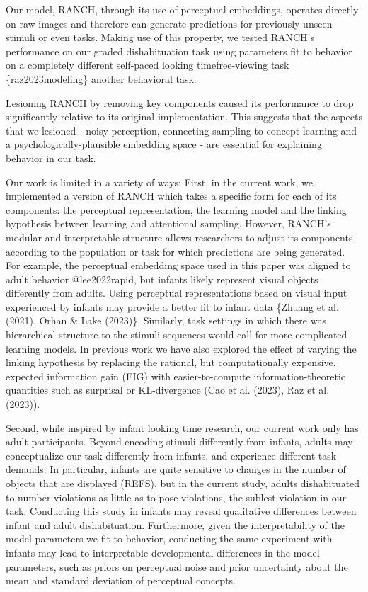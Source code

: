 \documentclass[10pt, letterpaper]{article}
\begin{document}
Our model, RANCH, through its use of perceptual embeddings, operates
directly on raw images and therefore can generate predictions for
previously unseen stimuli or even tasks. Making use of this property, we
tested RANCH's performance on our graded dishabituation task using
parameters fit to behavior on a completely different self-paced looking
timefree-viewing task \{raz2023modeling\} another behavioral task.

Lesioning RANCH by removing key components caused its performance to
drop significantly relative to its original implementation. This
suggests that the aspects that we lesioned - noisy perception,
connecting sampling to concept learning and a psychologically-plausible
embedding space - are essential for explaining behavior in our task.

Our work is limited in a variety of ways: First, in the current work, we
implemented a version of RANCH which takes a specific form for each of
its components: the perceptual representation, the learning model and
the linking hypothesis between learning and attentional sampling.
However, RANCH's modular and interpretable structure allows researchers
to adjust its components according to the population or task for which
predictions are being generated. For example, the perceptual embedding
space used in this paper was aligned to adult behavior @lee2022rapid,
but infants likely represent visual objects differently from adults.
Using perceptual representations based on visual input experienced by
infants may provide a better fit to infant data \{Zhuang et al. (2021),
Orhan \& Lake (2023)\}. Similarly, task settings in which there was
hierarchical structure to the stimuli sequences would call for more
complicated learning models. In previous work we have also explored the
effect of varying the linking hypothesis by replacing the rational, but
computationally expensive, expected information gain (EIG) with
easier-to-compute information-theoretic quantities such as surprisal or
KL-divergence (Cao et al. (2023), Raz et al. (2023)).

Second, while inspired by infant looking time research, our current work
only has adult participants. Beyond encoding stimuli differently from
infants, adults may conceptualize our task differently from infants, and
experience different task demands. In particular, infants are quite
sensitive to changes in the number of objects that are displayed (REFS),
but in the current study, adults dishabituated to number violations as
little as to pose violations, the sublest violation in our task.
Conducting this study in infants may reveal qualitative differences
between infant and adult dishabituation. Furthermore, given the
interpretability of the model parameters we fit to behavior, conducting
the same experiment with infants may lead to interpretable developmental
differences in the model parameters, such as priors on perceptual noise
and prior uncertainty about the mean and standard deviation of
perceptual concepts.
\end{document}
